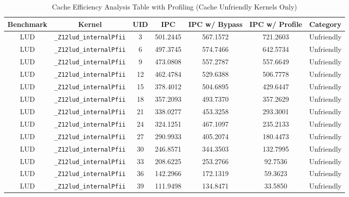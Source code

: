 \documentclass{article}
\begin{document}
\begin{table}[H]
	\small
	\caption{Cache Efficiency Analysis Table with Profiling (Cache Unfriendly Kernels Only)} %
	\centering %
	\begin{tabular}{c c c c c c c} %
		\hline\hline %
		Benchmark & Kernel                               & UID & IPC      & IPC w/ Bypass & IPC w/ Profile & Category   \\ [0.5ex] %
		\hline %
		LUD       & \verb|_Z12lud_internalPfii|          & 3   & 501.2445 & 567.1572      & 721.2603       & Unfriendly \\
		LUD       & \verb|_Z12lud_internalPfii|          & 6   & 497.3745 & 574.7466      & 642.5734       & Unfriendly \\
		LUD       & \verb|_Z12lud_internalPfii|          & 9   & 473.0808 & 557.2787      & 557.6649       & Unfriendly \\
		LUD       & \verb|_Z12lud_internalPfii|          & 12  & 462.4784 & 529.6388      & 506.7778       & Unfriendly \\
		LUD       & \verb|_Z12lud_internalPfii|          & 15  & 378.4012 & 504.6895      & 429.6447       & Unfriendly \\
		LUD       & \verb|_Z12lud_internalPfii|          & 18  & 357.2093 & 493.7370      & 357.2629       & Unfriendly \\
		LUD       & \verb|_Z12lud_internalPfii|          & 21  & 338.0277 & 453.3258      & 293.3001       & Unfriendly \\
		LUD       & \verb|_Z12lud_internalPfii|          & 24  & 324.1251 & 467.1097      & 235.2133       & Unfriendly \\
		LUD       & \verb|_Z12lud_internalPfii|          & 27  & 290.9933 & 405.2074      & 180.4473       & Unfriendly \\
		LUD       & \verb|_Z12lud_internalPfii|          & 30  & 246.8571 & 344.3503      & 132.7995       & Unfriendly \\
		LUD       & \verb|_Z12lud_internalPfii|          & 33  & 208.6225 & 253.2766      & 92.7536        & Unfriendly \\
		LUD       & \verb|_Z12lud_internalPfii|          & 36  & 142.2966 & 172.1319      & 59.3623        & Unfriendly \\
		LUD       & \verb|_Z12lud_internalPfii|          & 39  & 111.9498 & 134.8471      & 33.5850        & Unfriendly \\

\end{tabular}
\end{table}
\end{document}
